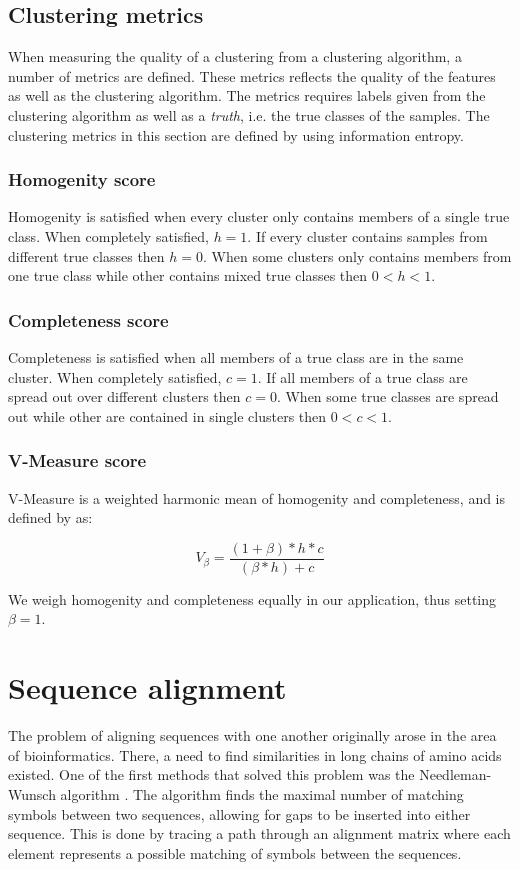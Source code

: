 \documentclass[a4paper]{report}
\begin{document}
\subsection{Clustering metrics}
When measuring the quality of a clustering from a clustering algorithm, a
number of metrics are defined. These metrics reflects the quality of the
features as well as the clustering algorithm. The metrics requires labels
given from the clustering algorithm as well as a \emph{truth}, i.e. the true
classes of the samples. The clustering metrics in this section are defined
by \citet{rosenberg07} using information entropy.

\subsubsection{Homogenity score}
Homogenity is satisfied when every cluster only contains members of a single
true class. When completely satisfied, $h = 1$. If every cluster contains
samples from different true classes then $h = 0$. When some clusters only
contains members from one true class while other contains mixed true classes
then $0 < h < 1$.

\subsubsection{Completeness score}
Completeness is satisfied when all members of a true class are in the same
cluster. When completely satisfied, $c = 1$. If all members of a true class
are spread out over different clusters then $c = 0$. When some true classes
are spread out while other are contained in single clusters then
$0 < c < 1$.

\subsubsection{V-Measure score}
V-Measure is a weighted harmonic mean of homogenity and completeness, and
is defined by \citeauthor{rosenberg07} as:

\[
    V_{\beta} = \frac{(1 + \beta) * h * c}{(\beta * h) + c}
\]

We weigh homogenity and completeness equally in our application, thus setting
$\beta = 1$.

\section{Sequence alignment}
The problem of aligning sequences with one another originally arose in the area
of bioinformatics. There, a need to find similarities in long chains of amino
acids existed. One of the first methods that solved this problem was the
Needleman-Wunsch algorithm \citep{needleman70}. The algorithm finds the maximal
number of matching symbols between two sequences, allowing for gaps to be
inserted into either sequence. This is done by tracing a path through an
alignment matrix where each element represents a possible matching of symbols
between the sequences.
\end{document}
